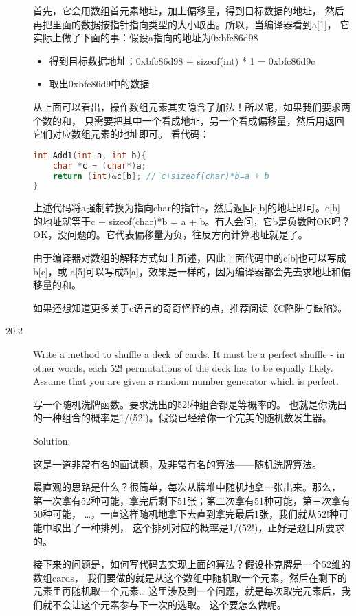 \begin{description}
首先，它会用数组首元素地址，加上偏移量，得到目标数据的地址， 然后再把里面的数据按指针指向类型的大小取出。所以，当编译器看到a[1]， 它实际上做了下面的事：假设a指向的地址为0xbfc86d98
\begin{itemize}
\item 得到目标数据地址：0xbfc86d98 + sizeof(int) * 1 = 0xbfc86d9c
\item 取出0xbfc86d9中的数据
\end{itemize}
从上面可以看出，操作数组元素其实隐含了加法！所以呢，如果我们要求两个数的和， 只需要把其中一个看成地址，另一个看成偏移量，然后用返回它们对应数组元素的地址即可。 看代码：
\begin{lstlisting}[language=C++]
int Add1(int a, int b){
    char *c = (char*)a;
    return (int)&c[b]; // c+sizeof(char)*b=a + b
}
\end{lstlisting}
上述代码将a强制转换为指向char的指针c，然后返回c[b]的地址即可。c[b] 的地址就等于c + sizeof(char)*b = a + b。有人会问，它b是负数时OK吗？ OK，没问题的。它代表偏移量为负，往反方向计算地址就是了。

由于编译器对数组的解释方式如上所述，因此上面代码中的c[b]也可以写成b[c]，或 a[5]可以写成5[a]，效果是一样的，因为编译器都会先去求地址和偏移量的和。

如果还想知道更多关于c语言的奇奇怪怪的点，推荐阅读《C陷阱与缺陷》。
%


\item[20.2] Write a method to shuffle a deck of cards. It must be a perfect shuffle - in other words, each 52! permutations of the deck has to be equally likely. Assume that you are given a random number generator which is perfect.

写一个随机洗牌函数。要求洗出的52!种组合都是等概率的。 也就是你洗出的一种组合的概率是1/(52!)。假设已经给你一个完美的随机数发生器。

Solution:

这是一道非常有名的面试题，及非常有名的算法——随机洗牌算法。

最直观的思路是什么？很简单，每次从牌堆中随机地拿一张出来。那么， 第一次拿有52种可能，拿完后剩下51张；第二次拿有51种可能，第三次拿有50种可能， …，一直这样随机地拿下去直到拿完最后1张，我们就从52!种可能中取出了一种排列， 这个排列对应的概率是1/(52!)，正好是题目所要求的。

接下来的问题是，如何写代码去实现上面的算法？假设扑克牌是一个52维的数组cards， 我们要做的就是从这个数组中随机取一个元素，然后在剩下的元素里再随机取一个元素… 这里涉及到一个问题，就是每次取完元素后，我们就不会让这个元素参与下一次的选取。 这个要怎么做呢。


\end{description}
